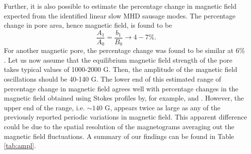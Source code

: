     Further, it is also possible to estimate the percentage change in magnetic field expected from the identified linear slow MHD sausage modes.
    The percentage change in pore area, hence magnetic field, is found to be $$\frac{A_1}{A_0} = \frac{b_1}{B_0} \rightarrow 4-7\%.$$
   	For another magnetic pore, the percentage change was found to be similar at 6\% \citep{0004-637X-806-1-132}.
    Let us now assume that the equilibrium magnetic field strength of the pore takes typical values of 1000-2000 G.
    Then, the amplitude of the magnetic field oscillations should be 40-140 G.
    The lower end of this estimated range of percentage change in magnetic field agrees well with percentage changes in the magnetic field obtained using Stokes profiles by, for example, \citet{Balthasar2000} and \citet{PMHDW}.
    However, the upper end of the range, i.e. $\sim 140$ G, appears twice as large as any of the previously reported periodic variations in magnetic field. 
    This apparent difference could be due to the spatial resolution of the magnetograms averaging out the magnetic field fluctuations.
    A summary of our findings can be found in Table \ref{tab:ampl}.
    

